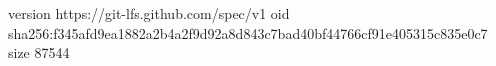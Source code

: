 version https://git-lfs.github.com/spec/v1
oid sha256:f345afd9ea1882a2b4a2f9d92a8d843c7bad40bf44766cf91e405315c835e0c7
size 87544
